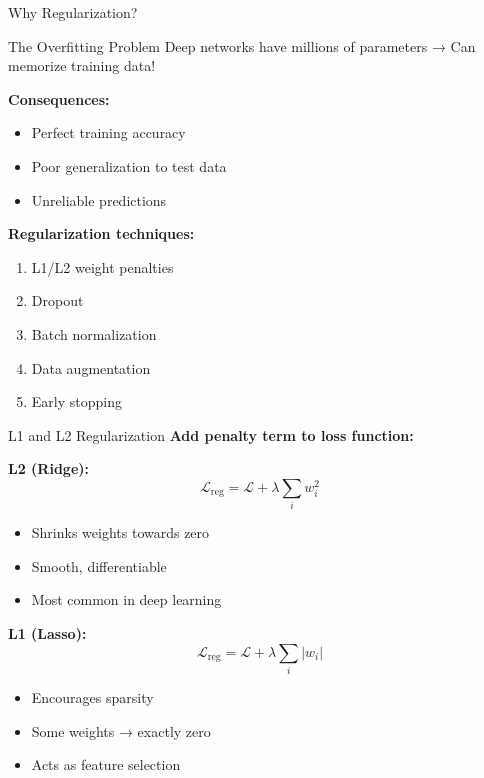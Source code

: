 \documentclass[aspectratio=169]{beamer}
\begin{document}
\begin{frame}{Why Regularization?}
  \begin{alertbox}{The Overfitting Problem}
    Deep networks have millions of parameters → Can memorize training data!

    \textbf{Consequences:}
    \begin{itemize}
      \item Perfect training accuracy
      \item Poor generalization to test data
      \item Unreliable predictions
    \end{itemize}
  \end{alertbox}

  \vspace{0.5em}

  \textbf{Regularization techniques:}
  \begin{enumerate}
    \item L1/L2 weight penalties
    \item Dropout
    \item Batch normalization
    \item Data augmentation
    \item Early stopping
  \end{enumerate}
\end{frame}

\begin{frame}{L1 and L2 Regularization}
  \textbf{Add penalty term to loss function:}

  \vspace{0.5em}

  \textbf{L2 (Ridge):}
  \begin{equation}
    \mathcal{L}_{\text{reg}} = \mathcal{L} + \lambda \sum_{i} w_i^2
  \end{equation}
  \begin{itemize}
    \item Shrinks weights towards zero
    \item Smooth, differentiable
    \item Most common in deep learning
  \end{itemize}

  \vspace{0.5em}

  \textbf{L1 (Lasso):}
  \begin{equation}
    \mathcal{L}_{\text{reg}} = \mathcal{L} + \lambda \sum_{i} |w_i|
  \end{equation}
  \begin{itemize}
    \item Encourages sparsity
    \item Some weights → exactly zero
    \item Acts as feature selection
  \end{itemize}
\end{frame}
\end{document}
